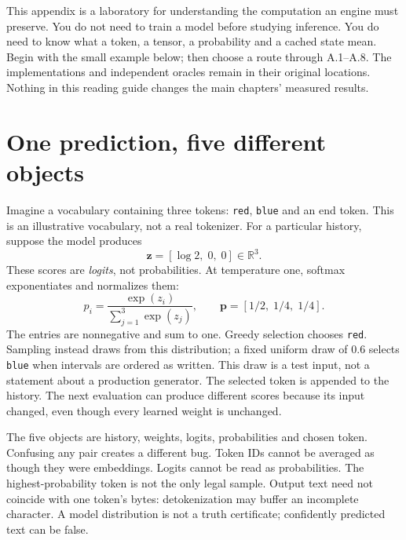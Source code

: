 \begin{ChapterIntent}
This appendix is a laboratory for understanding the computation an engine
must preserve. You do not need to train a model before studying inference.
You do need to know what a token, a tensor, a probability and a cached state
mean. Begin with the small example below; then choose a route through
A.1--A.8. The implementations and independent oracles remain in their original
locations. Nothing in this reading guide changes the main chapters'
measured results.
\end{ChapterIntent}

\section*{One prediction, five different objects}
Imagine a vocabulary containing three tokens: \texttt{red}, \texttt{blue}
and an end token. This is an illustrative vocabulary, not a real tokenizer.
For a particular history, suppose the model produces
\[
 \mathbf{z}=[\log 2,\;0,\;0]\in\mathbb{R}^{3}.
\]
These scores are \emph{logits}, not probabilities. At temperature one,
softmax exponentiates and normalizes them:
\[
 p_i=\frac{\exp(z_i)}{\sum_{j=1}^{3}\exp(z_j)},\qquad
 \mathbf{p}=[1/2,\;1/4,\;1/4].
\]
The entries are nonnegative and sum to one. Greedy selection chooses
\texttt{red}. Sampling instead draws from this distribution; a fixed uniform
draw of $0.6$ selects \texttt{blue} when intervals are ordered as written.
This draw is a test input, not a statement about a production generator.
The selected token is appended to the history. The next evaluation can
produce different scores because its input changed, even though every
learned weight is unchanged.

The five objects are history, weights, logits, probabilities and chosen
token. Confusing any pair creates a different bug. Token IDs cannot be
averaged as though they were embeddings. Logits cannot be read as
probabilities. The highest-probability token is not the only legal sample.
Output text need not coincide with one token's bytes: detokenization may
buffer an incomplete character. A model distribution is not a truth
certificate; confidently predicted text can be false.

\begingroup
\setcounter{figure}{0}
\renewcommand{\thefigure}{A.0.\arabic{figure}}
\endgroup

